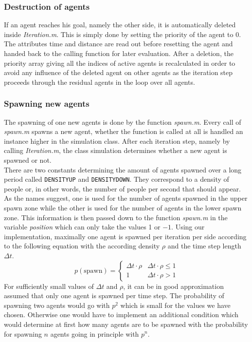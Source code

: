 \subsubsection{Destruction of agents}
If an agent reaches his goal, namely the other side, it is automatically deleted inside \textit{Iteration.m}. This is simply done by setting the priority of the agent to 0. The attributes time and distance are read out before resetting the agent and handed back to the calling function for later evaluation. After a deletion, the priority array giving all the indices of active agents is recalculated in order to avoid any influence of the deleted agent on other agents as the iteration step proceeds through the residual agents in the loop over all agents.
\subsubsection{Spawning new agents}
The spawning of one new agents is done by the function \textit{spawn.m}. Every call of \textit{spawn.m} spawns a new agent, whether the function is called at all is handled an instance higher in the simulation class. After each iteration step, namely by calling \textit{Iteration.m}, the class simulation determines whether a new agent is spawned or not.\\
\noi There are two constants determining the amount of agents spawned over a long period called \texttt{DENSITYUP} and \texttt{DENSITYDOWN}. They correspond to a density of people or, in other words, the number of people per second that should appear. As the names suggest, one is used for the number of agents spawned in the upper spawn zone while the other is used for the number of agents in the lower spawn zone. This information is then passed down to the function \textit{spawn.m} in the variable \textit{position} which can only take the values 1 or $-1$. Using our implementation, maximally one agent is spawned per iteration per side according to the following equation with the according density $\rho$ and the time step length $\Delta t$.\begin{equation}\label{iteration1}
	p(\text{spawn}) = \left\{\begin{array}{cc}\Delta t \cdot \rho&\Delta t \cdot \rho \leq 1\\1&\Delta t \cdot \rho > 1\end{array}\right.
\end{equation}
\noi For sufficiently small values of $\Delta t$ and $\rho$, it can be in good approximation assumed that only one agent is spawned per time step. The probability of spawning two agents would go with $p^2$ which is small for the values we have chosen. Otherwise one would have to implement an additional condition which would determine at first how many agents are to be spawned with the probability for spawning $n$ agents going in principle with $p^n$.\\
